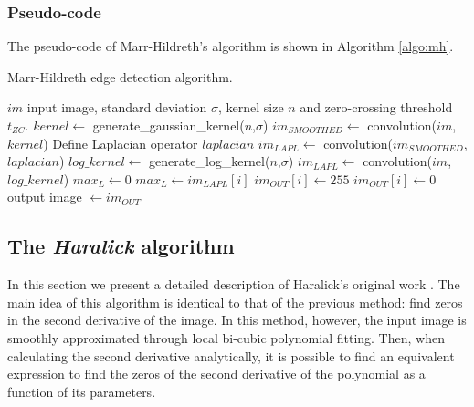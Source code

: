\documentclass{ipol}
\numberwithin{equation}{section}
\numberwithin{table}{section}
\begin{document}
\subsubsection{Pseudo-code}

The pseudo-code of Marr-Hildreth's algorithm is shown in Algorithm \ref{algo:mh}.

\begin{algorithm}[t!]
\caption{Marr-Hildreth edge detection algorithm.}
\label{algo:mh}
\begin{algorithmic}[1]
\REQUIRE $im$ input image, standard deviation $\sigma$, kernel size $n$ and zero-crossing threshold $t_{ZC}$.
	\STATE $kernel \leftarrow$ generate\_gaussian\_kernel($n$,$\sigma$)
	\STATE $im_{SMOOTHED} \leftarrow$ convolution($im$,$kernel$)
	\STATE Define Laplacian operator $laplacian$
	\STATE $im_{LAPL} \leftarrow$ convolution($im_{SMOOTHED}$,$laplacian$)
\ELSE
\STATE $log\_kernel \leftarrow$ generate\_log\_kernel($n$,$\sigma$)
\STATE $im_{LAPL} \leftarrow$ convolution($im$,$log\_kernel$)
\ENDIF
\STATE $max_L \leftarrow 0$
		\STATE $max_L \leftarrow im_{LAPL}[i]$
	\ENDIF
\ENDFOR
{}
			\STATE $im_{OUT}[i] \leftarrow 255$
		\ELSE
			\STATE $im_{OUT}[i] \leftarrow 0$
		\ENDIF
	\ENDFOR
\ENDFOR
\RETURN output image $\leftarrow im_{OUT}$
\end{algorithmic}
\end{algorithm}


\subsection{The \textit{Haralick} algorithm}

In this section we present a detailed description of Haralick's original work \cite{bb20239}.
The main idea of this algorithm is identical to that of the previous method: find zeros in 
the second derivative of the image. In this method, however, the input image is smoothly approximated through local bi-cubic
polynomial fitting. Then, when calculating the second derivative analytically, it is possible to find 
an equivalent expression to find the zeros of the second derivative of the polynomial as a function of 
its parameters.%
\end{document}
